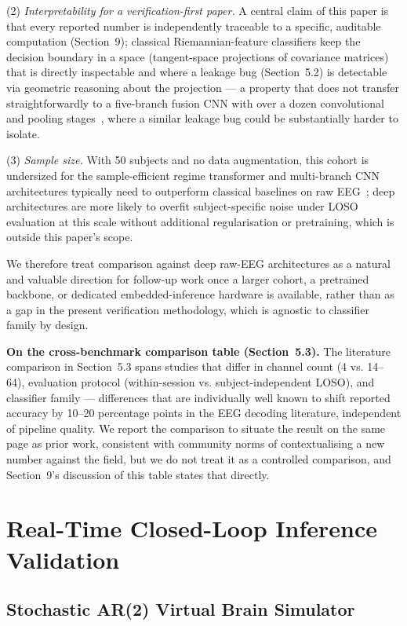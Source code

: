 \documentclass[11pt]{article}
\begin{document}
(2) \emph{Interpretability for a verification-first paper.} A central claim of this paper is that every reported number is independently traceable to a specific, auditable computation (Section~9); classical Riemannian-feature classifiers keep the decision boundary in a space (tangent-space projections of covariance matrices) that is directly inspectable and where a leakage bug (Section~5.2) is detectable via geometric reasoning about the projection --- a property that does not transfer straightforwardly to a five-branch fusion CNN with over a dozen convolutional and pooling stages~\cite{chowdhury2023}, where a similar leakage bug could be substantially harder to isolate.

(3) \emph{Sample size.} With 50 subjects and no data augmentation, this cohort is undersized for the sample-efficient regime transformer and multi-branch CNN architectures typically need to outperform classical baselines on raw EEG~\cite{chowdhury2023,efficacy2022}; deep architectures are more likely to overfit subject-specific noise under LOSO evaluation at this scale without additional regularisation or pretraining, which is outside this paper's scope.

We therefore treat comparison against deep raw-EEG architectures as a natural and valuable direction for follow-up work once a larger cohort, a pretrained backbone, or dedicated embedded-inference hardware is available, rather than as a gap in the present verification methodology, which is agnostic to classifier family by design.

\textbf{On the cross-benchmark comparison table (Section~5.3).} The literature comparison in Section~5.3 spans studies that differ in channel count (4 vs. 14--64), evaluation protocol (within-session vs. subject-independent LOSO), and classifier family --- differences that are individually well known to shift reported accuracy by 10--20 percentage points in the EEG decoding literature, independent of pipeline quality. We report the comparison to situate the result on the same page as prior work, consistent with community norms of contextualising a new number against the field, but we do not treat it as a controlled comparison, and Section~9's discussion of this table states that directly.

\section{Real-Time Closed-Loop Inference Validation}

\subsection{Stochastic AR(2) Virtual Brain Simulator}
\end{document}
